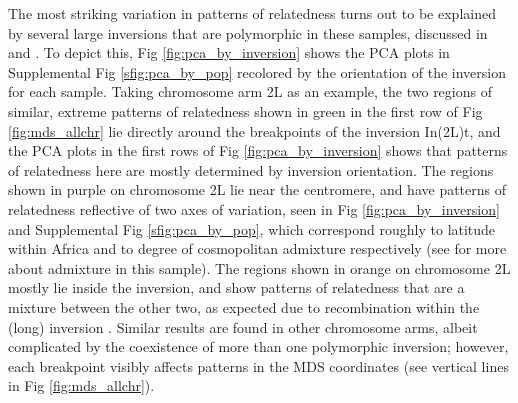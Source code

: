 \documentclass[11pt, oneside]{article}   	%
\newcommand\citet{\cite}
\newcommand\citep{\cite}
\newcommand{\Figure}{Fig }
\newcommand{\Figure}{{Figure }}
\newcommand{\plr}[1]{{\em \color{blue} #1}}
\begin{document}
The most striking variation in patterns of relatedness turns out to be explained by
several large inversions that are polymorphic in these samples, 
discussed in \citet{corbett2012population} and \citet{langley2012genomic}.
To depict this, \Figure \ref{fig:pca_by_inversion} shows
the PCA plots in Supplemental \Figure \ref{sfig:pca_by_pop} recolored by the orientation of the inversion for each sample.
Taking chromosome arm 2L as an example,
the two regions of similar, extreme patterns of relatedness
shown in green in the first row of \Figure \ref{fig:mds_allchr}
lie directly around the breakpoints of the inversion In(2L)t,
and the PCA plots in the first rows of \Figure \ref{fig:pca_by_inversion}
shows that patterns of relatedness here are mostly determined by inversion orientation.
The regions shown in purple on chromosome 2L lie near the centromere,
and have patterns of relatedness reflective of two axes of variation,
seen in \Figure \ref{fig:pca_by_inversion} and Supplemental \Figure \ref{sfig:pca_by_pop},
which correspond roughly to latitude within Africa and to degree of cosmopolitan admixture respectively
(see \citet{lack2015drosophila} for more about admixture in this sample).
The regions shown in orange on chromosome 2L mostly lie inside the inversion,
and show patterns of relatedness that are a mixture between the other two,
as expected due to recombination within the (long) inversion \citep{guerrero2011coalescent}.
Similar results are found in other chromosome arms,
albeit complicated by the coexistence of more than one polymorphic inversion;
however, each breakpoint visibly affects patterns in the MDS coordinates
(see vertical lines in \Figure \ref{fig:mds_allchr}).

\end{document}
